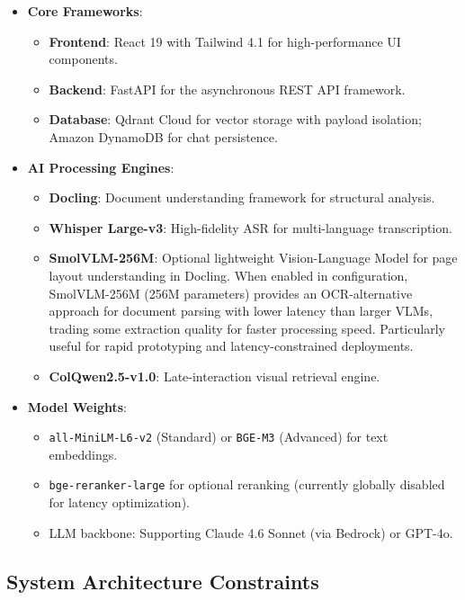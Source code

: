 \begin{itemize}
    \item \textbf{Core Frameworks}:
    \begin{itemize}
        \item \textbf{Frontend}: React 19 with Tailwind 4.1 for high-performance UI components.
        \item \textbf{Backend}: FastAPI for the asynchronous REST API framework.
        \item \textbf{Database}: Qdrant Cloud for vector storage with payload isolation; Amazon DynamoDB for chat persistence.
    \end{itemize}
    \item \textbf{AI Processing Engines}:
    \begin{itemize}
        \item \textbf{Docling}: Document understanding framework for structural analysis.
        \item \textbf{Whisper Large-v3}: High-fidelity ASR for multi-language transcription.
        \item \textbf{SmolVLM-256M}: Optional lightweight Vision-Language Model for page layout understanding in Docling. When enabled in configuration, SmolVLM-256M (256M parameters) provides an OCR-alternative approach for document parsing with lower latency than larger VLMs, trading some extraction quality for faster processing speed. Particularly useful for rapid prototyping and latency-constrained deployments.
        \item \textbf{ColQwen2.5-v1.0}: Late-interaction visual retrieval engine.
    \end{itemize}
    \item \textbf{Model Weights}:
    \begin{itemize}
        \item \texttt{all-MiniLM-L6-v2} (Standard) or \texttt{BGE-M3} (Advanced) for text embeddings.
        \item \texttt{bge-reranker-large} for optional reranking (currently globally disabled for latency optimization).
        \item LLM backbone: Supporting Claude 4.6 Sonnet (via Bedrock) or GPT-4o.
    \end{itemize}
\end{itemize}

\subsection{System Architecture Constraints}
\label{sec:architecture_constraints}

